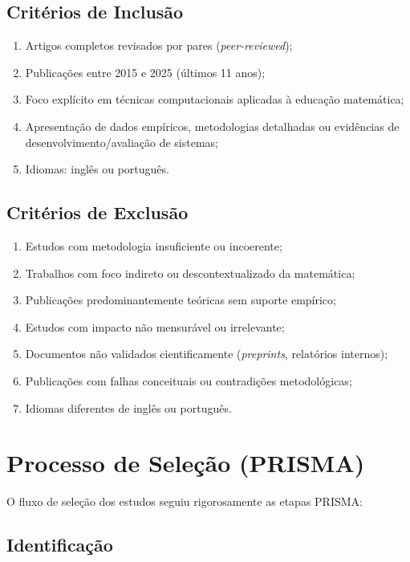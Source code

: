 \subsection{Critérios de Inclusão}

\begin{enumerate}
    \item Artigos completos revisados por pares (\textit{peer-reviewed});
    \item Publicações entre 2015 e 2025 (últimos 11 anos);
    \item Foco explícito em técnicas computacionais aplicadas à educação matemática;
    \item Apresentação de dados empíricos, metodologias detalhadas ou evidências de desenvolvimento/avaliação de sistemas;
    \item Idiomas: inglês ou português.
\end{enumerate}

\subsection{Critérios de Exclusão}

\begin{enumerate}
    \item Estudos com metodologia insuficiente ou incoerente;
    \item Trabalhos com foco indireto ou descontextualizado da matemática;
    \item Publicações predominantemente teóricas sem suporte empírico;
    \item Estudos com impacto não mensurável ou irrelevante;
    \item Documentos não validados cientificamente (\textit{preprints}, relatórios internos);
    \item Publicações com falhas conceituais ou contradições metodológicas;
    \item Idiomas diferentes de inglês ou português.
\end{enumerate}

\section{Processo de Seleção (PRISMA)}

O fluxo de seleção dos estudos seguiu rigorosamente as etapas PRISMA:

\subsection{Identificação}

